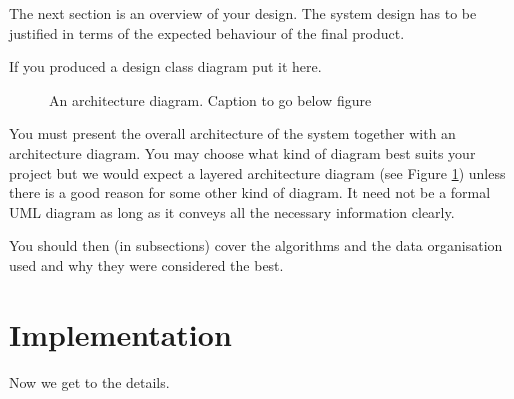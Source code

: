 \documentclass[11pt,a4paper]{article}
\begin{document}
The next section is an overview of your design. The system design has
to be justified in terms of the expected behaviour of the final
product. 

If you produced a design class diagram put it here.

\begin{figure}[h!]
  \caption{An architecture diagram. Caption to go below figure}
  \label{fig:architecture}
\end{figure}

You must present the overall architecture of the system together with
an architecture diagram. You may choose what kind of diagram best
suits your project but we would expect a layered architecture diagram
(see Figure \ref{fig:architecture}) unless there is a good reason for
some other kind of diagram. It need not be a formal UML diagram as
long as it conveys all the necessary information clearly.

You should then (in subsections) cover the algorithms and the data
organisation used and why they were considered the best. 

\section{Implementation}

Now we get to the details. 
\end{document}

